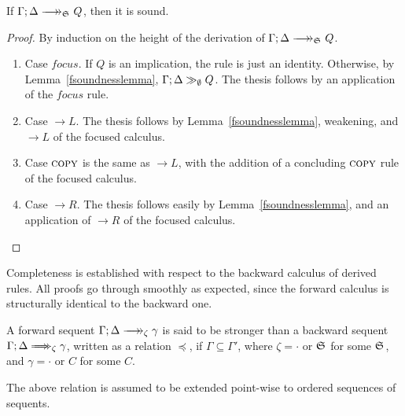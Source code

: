 \begin{theorem}[Soundness]
  If $\zfneuseq{\Gamma}{\Delta}{\ctrlset{}}{Q}$, then it is sound.
\end{theorem}
\begin{proof}
  By induction on the height of the derivation of
  $\zfneuseq{\Gamma}{\Delta}{\ctrlset{}}{Q}$.

  \begin{enumerate}
  \item Case $focus$.
    If $Q$ is an implication, the rule is just an identity. Otherwise, by
    Lemma~\ref{fsoundnesslemma}, $\Gamma; \Delta \gg_{\emptyset} Q$. The thesis
    follows by an application of the $focus$ rule.

  \item Case $\rightarrow L$.
    The thesis follows by Lemma~\ref{fsoundnesslemma}, weakening, and
    $\rightarrow L$ of the focused calculus.

  \item Case $\textsc{copy}$ is the same as $\rightarrow L$, with the addition of a
    concluding $\textsc{copy}$ rule of the focused calculus.

  \item Case $\rightarrow R$.
    The thesis follows easily by Lemma~\ref{fsoundnesslemma}, and an application
    of $\rightarrow R$ of the focused calculus.

  \end{enumerate}
\end{proof}

Completeness is established with respect to the backward calculus of derived
rules. All proofs go through smoothly as expected, since the forward calculus is
structurally identical to the backward one.

\begin{definition}
  A forward sequent $\zfneuseq{\Gamma}{\Delta}{\zeta}{\gamma}$ is said to be
  stronger than a backward sequent
  $\zbneuseq{\Gamma}{\Delta}{\zeta}{\gamma}$, written as a relation
  $\preceq$, if $\Gamma \subseteq \Gamma'$, where $\zeta = \cdot$ or
  $\mathfrak{S}_{}$ for some $\mathfrak{S}_{}$, and $\gamma = \cdot$ or $C$ for some $C$.
\end{definition}

The above relation is assumed to be extended point-wise to ordered sequences of
sequents.

